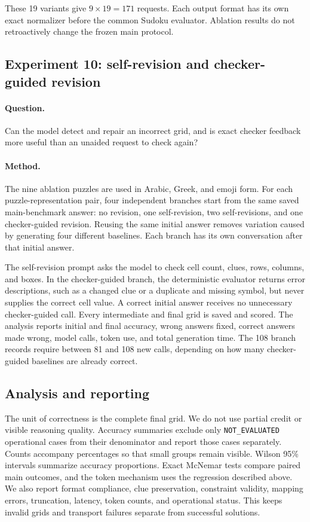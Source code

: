 \documentclass[11pt,a4paper]{article}
\begin{document}
These 19 variants give $9\times19=171$ requests.  Each output format has its own exact normalizer before the common Sudoku evaluator.  Ablation results do not retroactively change the frozen main protocol.

\subsection{Experiment 10: self-revision and checker-guided revision}
\paragraph{Question.}
Can the model detect and repair an incorrect grid, and is exact checker feedback more useful than an unaided request to check again?

\paragraph{Method.}
The nine ablation puzzles are used in Arabic, Greek, and emoji form.  For each puzzle-representation pair, four independent branches start from the same saved main-benchmark answer: no revision, one self-revision, two self-revisions, and one checker-guided revision.  Reusing the same initial answer removes variation caused by generating four different baselines.  Each branch has its own conversation after that initial answer.

The self-revision prompt asks the model to check cell count, clues, rows, columns, and boxes.  In the checker-guided branch, the deterministic evaluator returns error descriptions, such as a changed clue or a duplicate and missing symbol, but never supplies the correct cell value.  A correct initial answer receives no unnecessary checker-guided call.  Every intermediate and final grid is saved and scored.  The analysis reports initial and final accuracy, wrong answers fixed, correct answers made wrong, model calls, token use, and total generation time.  The 108 branch records require between 81 and 108 new calls, depending on how many checker-guided baselines are already correct.

\subsection{Analysis and reporting}
The unit of correctness is the complete final grid. We do not use partial credit or visible reasoning quality. Accuracy summaries exclude only \texttt{NOT\_EVALUATED} operational cases from their denominator and report those cases separately. Counts accompany percentages so that small groups remain visible. Wilson 95\% intervals summarize accuracy proportions. Exact McNemar tests compare paired main outcomes, and the token mechanism uses the regression described above. We also report format compliance, clue preservation, constraint validity, mapping errors, truncation, latency, token counts, and operational status. This keeps invalid grids and transport failures separate from successful solutions.
\end{document}
